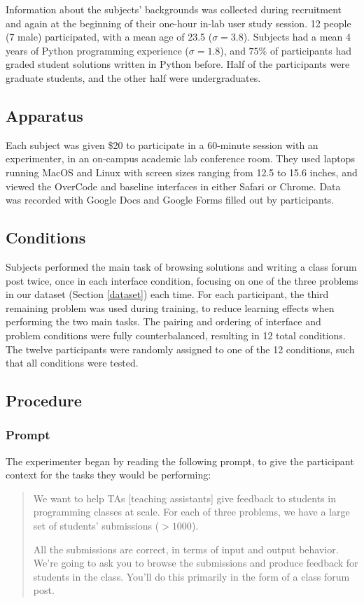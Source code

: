 Information about the subjects' backgrounds was collected during recruitment and again at the beginning of their one-hour in-lab user study session. 12 people (7 male) participated, with a mean age of 23.5 ($\sigma = 3.8$). Subjects had a mean 4 years of Python programming experience ($\sigma = 1.8$), and $75\%$ of participants had graded student solutions written in Python before. Half of the participants were graduate students, and the other half were undergraduates.

\subsection{Apparatus}

Each subject was given \$20 to participate in a 60-minute session with an experimenter, in an on-campus academic lab conference room. They used laptops running MacOS and Linux with screen sizes ranging from 12.5 to 15.6 inches, and viewed the OverCode and baseline interfaces in either Safari or Chrome. Data was recorded with Google Docs and Google Forms filled out by participants.
\subsection{Conditions}

Subjects performed the main task of browsing solutions and writing a class forum post twice, once in each interface condition, focusing on one of the three problems in our dataset (Section \ref{dataset}) each time. For each participant, the third remaining problem was used during training, to reduce learning effects when performing the two main tasks. The pairing and ordering of interface and problem conditions were fully counterbalanced, resulting in 12 total conditions. The twelve participants were randomly assigned to one of the 12 conditions, such that all conditions were tested.

\subsection{Procedure}

\subsubsection{Prompt}
The experimenter began by reading the following prompt, to give the participant context for the tasks they would be performing:

\begin{quote}

We want to help TAs [teaching assistants] give feedback to students in programming classes at scale. For each of three problems, we have a large set of students' submissions ($> 1000$). 

All the submissions are correct, in terms of input and output behavior. We're going to ask you to browse the submissions and produce feedback for students in the class. You'll do this primarily in the form of a class forum post.
\end{quote}

